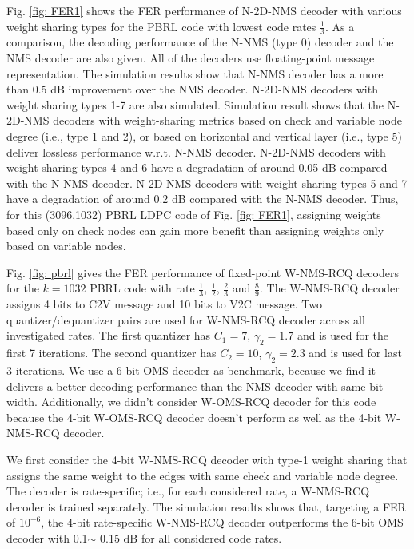 \documentclass [PhD] {uclathes}
\begin{document}
Fig. \ref{fig: FER1} shows the FER performance of  N-2D-NMS decoder with various weight sharing types for the PBRL code with lowest code rates $\frac{1}{3}$. As a comparison, the decoding performance of the N-NMS (type 0) decoder and the NMS decoder are also given. All of the decoders use floating-point message representation. The simulation results show that N-NMS decoder has a more than 0.5 dB improvement over the NMS decoder. N-2D-NMS decoders with weight sharing types 1-7  are also simulated. 
Simulation result shows that the N-2D-NMS decoders with weight-sharing metrics based on check and variable node degree (i.e., type 1 and 2), or based on horizontal and vertical layer  (i.e., type 5) deliver lossless performance w.r.t. N-NMS decoder.  N-2D-NMS decoders with weight sharing types 4 and 6 have a degradation of around 0.05 dB compared with the N-NMS decoder.  N-2D-NMS decoders with weight sharing types 5 and 7 have a degradation of around 0.2 dB compared with the N-NMS decoder. Thus, for this (3096,1032) PBRL LDPC code of Fig. \ref{fig: FER1}, assigning weights based only on check nodes can gain more benefit than assigning weights only based on variable nodes.



Fig. \ref{fig: pbrl} gives the FER performance of fixed-point W-NMS-RCQ decoders for the $k=1032$ PBRL code with rate $\frac{1}{3}$, $\frac{1}{2}$, $\frac{2}{3}$ and $\frac{8}{9}$. The W-NMS-RCQ decoder assigns 4 bits to C2V message and 10 bits to V2C message. Two quantizer/dequantizer pairs are used for W-NMS-RCQ decoder across all investigated rates.
The first quantizer has $C_1=7$, $\gamma_2=1.7$ and is used for the first 7 iterations. The second quantizer has $C_2=10$, $\gamma_2=2.3$ and is used for last 3 iterations.
We use a 6-bit OMS decoder as benchmark, because we find it delivers a better decoding performance than the NMS decoder with same bit width.
Additionally, we didn't consider W-OMS-RCQ decoder for this code because the 4-bit W-OMS-RCQ decoder doesn't perform as well as the 4-bit W-NMS-RCQ decoder. 

We first consider the 4-bit W-NMS-RCQ decoder with type-1 weight sharing that assigns the same weight to the edges with same check and variable node degree.
The decoder is rate-specific; i.e., for each considered rate, a W-NMS-RCQ decoder is trained separately.
The simulation results shows that, targeting a FER of $10^{-6}$, the 4-bit rate-specific W-NMS-RCQ decoder outperforms the 6-bit OMS decoder with 0.1$\sim$ 0.15 dB for all considered code rates.
\end{document}
